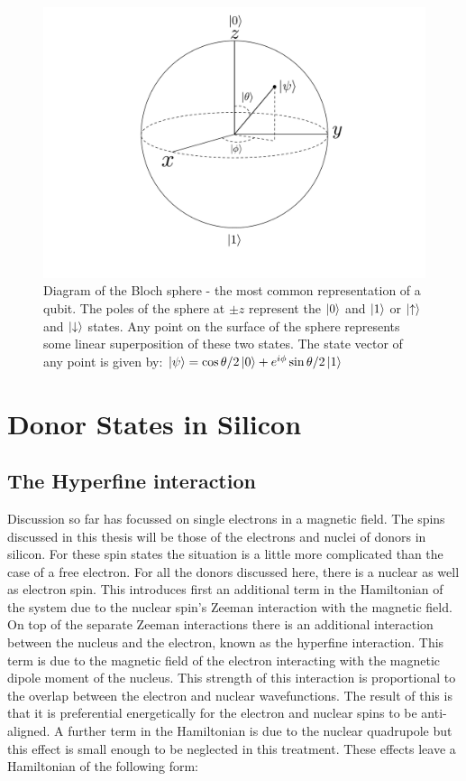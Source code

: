 \begin{figure}
\centering
\includegraphics[width = 0.8\columnwidth]{Figures/blochSphere.pdf}
\caption[Bloch Sphere]{Diagram of the Bloch sphere - the most common representation of a qubit. The poles of the sphere at $\pm z$ represent the $\ket{0}$ and $\ket{1}$ or $\ket{\uparrow}$ and $\ket{\downarrow}$ states. Any point on the surface of the sphere represents some linear superposition of these two states. The state vector of any point is given by: $\ket{\psi} = \cos{\theta/2}\ket{0} + e^{i\phi}\sin{\theta/2}\ket{1}$}
\label{fig:blochSphere}
\end{figure}

\section{Donor States in Silicon}

\subsection{The Hyperfine interaction}

Discussion so far has focussed on single electrons in a magnetic field.
The spins discussed in this thesis will be those of the electrons and nuclei of donors in silicon.
For these spin states the situation is a little more complicated than the case of a free electron.
For all the donors discussed here, there is a nuclear as well as electron spin.
This introduces first an additional term in the Hamiltonian of the system due to the nuclear spin's Zeeman interaction with the magnetic field.
On top of the separate Zeeman interactions there is an additional interaction between the nucleus and the electron, known as the hyperfine interaction.
This term is due to the magnetic field of the electron interacting with the magnetic dipole moment of the nucleus.
This strength of this interaction is proportional to the overlap between the electron and nuclear wavefunctions.
The result of this is that it is preferential energetically for the electron and nuclear spins to be anti-aligned.
A further term in the Hamiltonian is due to the nuclear quadrupole but this effect is small enough to be neglected in this treatment.
These effects leave a Hamiltonian of the following form:
 
